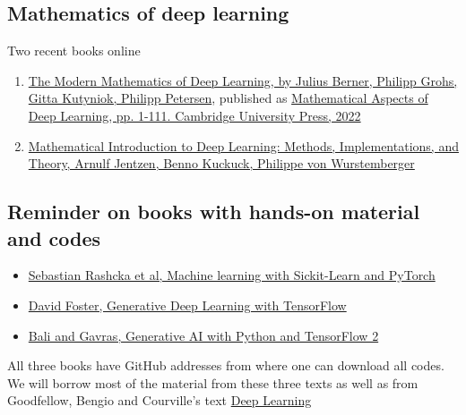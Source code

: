 \documentclass[%
oneside,                 %
final,                   %
10pt]{article}
\begin{document}
\noindent
\subsection{Mathematics of deep learning}

\begin{block}{Two recent books online }
\begin{enumerate}
\item \href{{https://arxiv.org/abs/2105.04026}}{The Modern Mathematics of Deep Learning, by Julius Berner, Philipp Grohs, Gitta Kutyniok, Philipp Petersen}, published as \href{{https://doi.org/10.1017/9781009025096.002}}{Mathematical Aspects of Deep Learning, pp. 1-111. Cambridge University Press, 2022}

\item \href{{https://doi.org/10.48550/arXiv.2310.20360}}{Mathematical Introduction to Deep Learning: Methods, Implementations, and Theory, Arnulf Jentzen, Benno Kuckuck, Philippe von Wurstemberger}
\end{enumerate}

\noindent
\end{block}

\subsection{Reminder on books with hands-on material and codes}
\begin{block}{}
\begin{itemize}
\item \href{{https://sebastianraschka.com/blog/2022/ml-pytorch-book.html}}{Sebastian Rashcka et al, Machine learning with Sickit-Learn and PyTorch}

\item \href{{https://www.oreilly.com/library/view/generative-deep-learning/9781098134174/ch01.html}}{David Foster, Generative Deep Learning with TensorFlow}

\item \href{{https://github.com/PacktPublishing/Hands-On-Generative-AI-with-Python-and-TensorFlow-2}}{Bali and Gavras, Generative AI with Python and TensorFlow 2}
\end{itemize}

\noindent
\end{block}

All three books have GitHub addresses from where  one can download all codes. We will borrow most of the material from these three texts as well as 
from Goodfellow, Bengio and Courville's text \href{{https://www.deeplearningbook.org/}}{Deep Learning}
\end{document}
